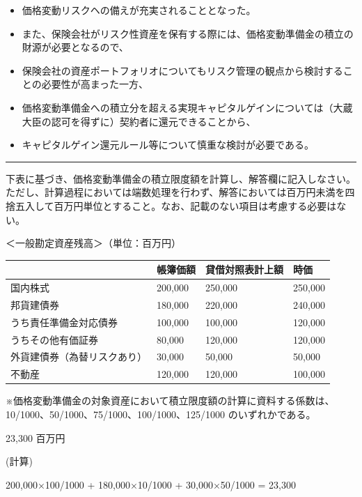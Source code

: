 \documentclass[report,gutter=10mm,fore-edge=10mm,uplatex,dvipdfmx]{jlreq}
\begin{document}
\begin{itemize}
\begin{itemize}
    \begin{itemize}
    \tightlist
    \item
      価格変動リスクヘの備えが充実されることとなった。
    \item
      また、保険会社がリスク性資産を保有する際には、価格変動準備金の積立の財源が必要となるので、
    \item
      保険会社の資産ポートフォリオについてもリスク管理の観点から検討することの必要性が高まった一方、
    \item
      価格変動準備金への積立分を超える実現キャピタルゲインについては（大蔵大臣の認可を得ずに）契約者に還元できることから、
    \item
      キャピタルゲイン還元ルール等について慎重な検討が必要である。
    \end{itemize}
  \end{itemize}
\end{itemize}

\begin{center}\rule{0.5\linewidth}{0.5pt}\end{center}


下表に基づき、価格変動準備金の積立限度額を計算し、解答欄に記入しなさい。ただし、計算過程においては端数処理を行わず、解答においては百万円未満を四捨五入して百万円単位とすること。なお、記載のない項目は考慮する必要はない。

＜一般勘定資産残高＞（単位：百万円）

\begin{longtable}[]{@{}llll@{}}
\toprule
& 帳簿価額 & 貸借対照表計上額 & 時価\tabularnewline
\midrule
\endhead
国内株式 & 200,000 & 250,000 & 250,000\tabularnewline
邦貨建債券 & 180,000 & 220,000 & 240,000\tabularnewline
うち責任準備金対応債券 & 100,000 & 100,000 & 120,000\tabularnewline
うちその他有価証券 & 80,000 & 120,000 & 120,000\tabularnewline
外貨建債券（為替リスクあり） & 30,000 & 50,000 & 50,000\tabularnewline
不動産 & 120,000 & 120,000 & 100,000\tabularnewline
\bottomrule
\end{longtable}

※価格変動準備金の対象資産において積立限度額の計算に資料する係数は、10/1000、50/1000、75/1000、100/1000、125/1000
のいずれかである。



23,300 百万円 

(計算) 

200,000×100/1000 + 180,000×10/1000 + 30,000×50/1000 = 23,300 
\end{document}
